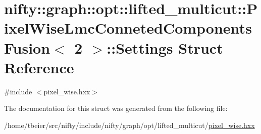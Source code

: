 \hypertarget{structnifty_1_1graph_1_1opt_1_1lifted__multicut_1_1PixelWiseLmcConnetedComponentsFusion_3_012_01_4_1_1Settings}{}\section{nifty\+:\+:graph\+:\+:opt\+:\+:lifted\+\_\+multicut\+:\+:Pixel\+Wise\+Lmc\+Conneted\+Components\+Fusion$<$ 2 $>$\+:\+:Settings Struct Reference}
\label{structnifty_1_1graph_1_1opt_1_1lifted__multicut_1_1PixelWiseLmcConnetedComponentsFusion_3_012_01_4_1_1Settings}


{\ttfamily \#include $<$pixel\+\_\+wise.\+hxx$>$}



The documentation for this struct was generated from the following file\+:\begin{DoxyCompactItemize}
\item 
/home/tbeier/src/nifty/include/nifty/graph/opt/lifted\+\_\+multicut/\hyperlink{pixel__wise_8hxx}{pixel\+\_\+wise.\+hxx}\end{DoxyCompactItemize}
